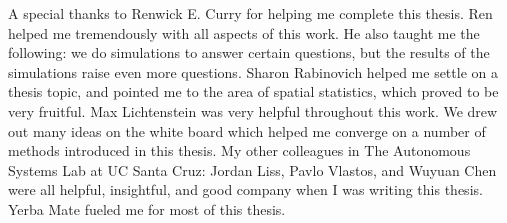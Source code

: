 
\begin{acknowledgements}

\noindent A special thanks to Renwick E. Curry for helping me complete this thesis. Ren helped me tremendously with all aspects of this work. He also taught me the following: we do simulations to answer certain questions, but the results of the simulations raise even more questions. Sharon Rabinovich helped me settle on a thesis topic, and pointed me to the area of spatial statistics, which proved to be very fruitful. Max Lichtenstein was very helpful throughout this work. We drew out many ideas on the white board which helped me converge on a number of methods introduced in this thesis. My other colleagues in The Autonomous Systems Lab at UC Santa Cruz: Jordan Liss, Pavlo Vlastos, and Wuyuan Chen were all helpful, insightful, and good company when I was writing this thesis. Yerba Mate fueled me for most of this thesis.\\

\end{acknowledgements}